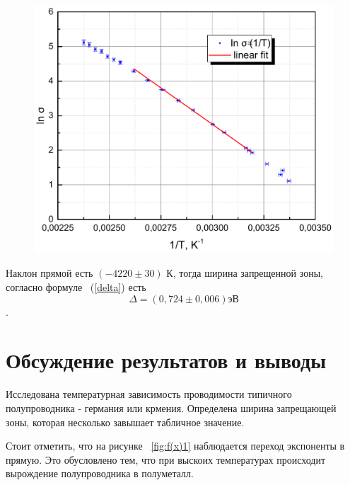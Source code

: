 \documentclass[a4paper,12pt]{article} %
\begin{document}
		\begin{figure}[h!]
			\begin{floatrow}
				{\includegraphics[scale=0.5]{graph2.pdf}}    
			\end{floatrow}
		\end{figure}
		Наклон прямой есть $(-4220 \pm 30)$ К, тогда ширина запрещенной зоны, согласно формуле ~(\ref{delta}) есть \[\boxed{\Delta = (0,724 \pm 0,006)\text{эВ}}\].
	
	
	
	
	
	
	
	
	\newpage
	\section{Обсуждение результатов и выводы}
		Исследована температурная зависимость проводимости типичного полупроводника - германия или крмения. Определена ширина запрещающей зоны, которая несколько завышает табличное значение.
		
		Стоит отметить, что на рисунке ~\ref{fig:f(x)1} наблюдается переход экспоненты в прямую. Это обусловлено тем, что при выскоих температурах происходит вырождение полупроводника в полуметалл.
	
\end{document}
